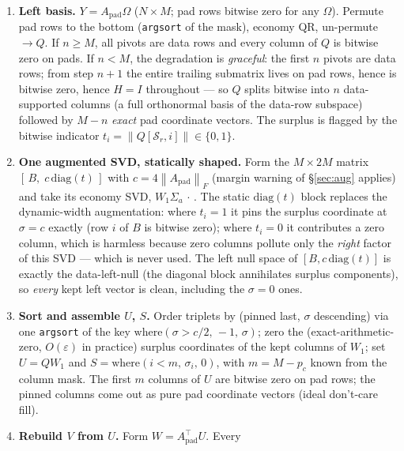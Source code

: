 \documentclass[11pt]{article}
\newcommand{\Apad}{A_{\mathrm{pad}}}
\newcommand{\norm}[1]{\left\lVert #1 \right\rVert}
\begin{document}
\begin{enumerate}[label=\textbf{Step \arabic*.}, leftmargin=2.2cm, itemsep=3pt]
  \item \textbf{Left basis.} $Y = \Apad \Omega$ ($N \times M$; pad rows
        bitwise zero for any $\Omega$). Permute pad rows to the bottom
        (\texttt{argsort} of the mask), economy QR, un-permute $\to Q$.
        If $n \ge M$, all pivots are data rows and every column of $Q$ is
        bitwise zero on pads. If $n < M$, the degradation is \emph{graceful}:
        the first $n$ pivots are data rows; from step $n+1$ the entire
        trailing submatrix lives on pad rows, hence is bitwise zero, hence
        $H = I$ throughout --- so $Q$ splits bitwise into $n$ data-supported
        columns (a full orthonormal basis of the data-row subspace) followed
        by $M - n$ \emph{exact} pad coordinate vectors. The surplus is
        flagged by the bitwise indicator
        $t_i = \norm{Q[\mathcal{S}_r, i]} \in \{0, 1\}$.
  \item \textbf{One augmented SVD, statically shaped.} Form the
        $M \times 2M$ matrix $[\,B,\; c\,\mathrm{diag}(t)\,]$ with
        $c = 4\norm{\Apad}_F$ (margin warning of \S\ref{sec:aug} applies) and
        take its economy SVD, $W_1 \Sigma_a \,\cdot\,$. The static
        $\mathrm{diag}(t)$ block replaces the dynamic-width augmentation:
        where $t_i = 1$ it pins the surplus coordinate at $\sigma = c$
        exactly (row $i$ of $B$ is bitwise zero); where $t_i = 0$ it
        contributes a zero column, which is harmless because zero columns
        pollute only the \emph{right} factor of this SVD --- which is never
        used. The left null space of $[B, c\,\mathrm{diag}(t)]$ is exactly
        the data-left-null (the diagonal block annihilates surplus
        components), so \emph{every} kept left vector is clean, including the
        $\sigma = 0$ ones.
  \item \textbf{Sort and assemble $U$, $S$.} Order triplets by (pinned last,
        $\sigma$ descending) via one \texttt{argsort} of the key
        $\mathrm{where}(\sigma > c/2,\, -1,\, \sigma)$; zero the
        (exact-arithmetic-zero, $O(\varepsilon)$ in practice) surplus
        coordinates of the kept columns of $W_1$; set $U = Q W_1$ and
        $S = \mathrm{where}(i < m,\, \sigma_i,\, 0)$, with $m = M - p_c$
        known from the column mask. The first $m$ columns of $U$ are bitwise
        zero on pad rows; the pinned columns come out as pure pad coordinate
        vectors (ideal don't-care fill).
  \item \textbf{Rebuild $V$ from $U$.} Form $W = \Apad^{\top} U$. Every

\end{enumerate}
\end{document}
